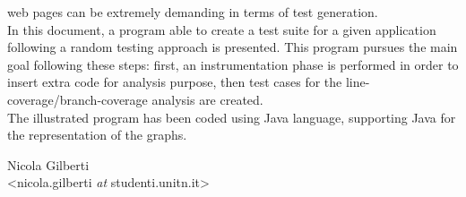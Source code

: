 web pages can be extremely demanding in terms of test generation.\\
In this document, a program able to create a test suite for a given application following a
random testing approach is presented. This program pursues the main goal following these
steps: first, an instrumentation phase is performed in order to insert extra code for analysis
purpose, then test cases for the line-coverage/branch-coverage analysis are created.\\
The illustrated program has been coded using Java language, supporting Java for the representation of the graphs. 
\vfill\noindent
\hfill
\begin{flushright}
\begin{minipage}[b]{0.45\textwidth}
 \centering
  Nicola Gilberti\\
 {\footnotesize <nicola.gilberti \textit{at} studenti.unitn.it>}
\end{minipage}
\end{flushright}
\newpage